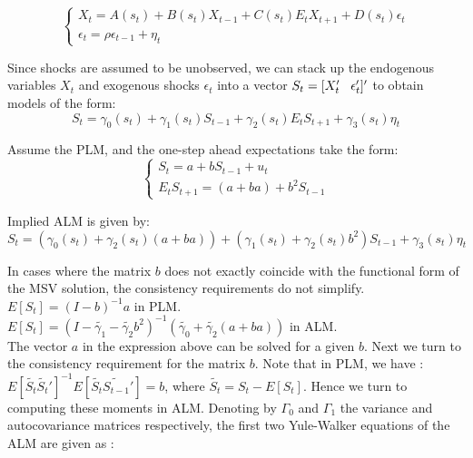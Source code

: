\documentclass[12pt,reqno]{article}
\numberwithin{equation}{section}
\begin{document}
$$
\begin{cases}
X_t = A(s_t) + B(s_t) X_{t-1} + C(s_t) E_t X_{t+1} + D(s_t) \epsilon_t \\
\epsilon_t = \rho \epsilon_{t-1} + \eta_t 
\end{cases}
$$

Since shocks are assumed to be unobserved, we can stack up the endogenous variables $X_t $ and exogenous shocks $\epsilon_t $ into a vector $ S_t = [X_t' \hspace{3 mm}\epsilon_t']' $ to obtain models of the form: \\

$$
S_t = \gamma_0 (s_t) + \gamma_1 (s_t) S_{t-1} + \gamma_2(s_t) E_t S_{t+1}  + \gamma_3 (s_t) \eta_t
$$

Assume the PLM, and the one-step ahead expectations take the form: \\

$$
\begin{cases}
S_t = a + b S_{t-1} + u_t \\
E_t S_{t+1} = (a+ba)+ b^2 S_{t-1} 
\end{cases}
$$

Implied ALM is given by: \\

$$ 
S_t = (\gamma_0 (s_t) + \gamma_2 (s_t) (a+ba))+ (\gamma_1 (s_t) +\gamma_2 (s_t) b^2 )S_{t-1} + \gamma_3(s_t) \eta_t 
$$

In cases where the matrix $b $ does not exactly coincide with the functional form of the MSV solution, the consistency requirements do not simplify. \\

$ E [ S_t ] = (I-b)^{-1} a  $ in PLM.  \\

$ E [S_t] = ( I -  \tilde{\gamma_1} - \tilde{\gamma_2} b^2 )^{-1} (\tilde{\gamma_0} + \tilde{\gamma_2}(a+ba)  ) $ in ALM. \\

The vector $ a $ in the expression above can be solved for a given $ b $. Next we turn to the consistency requirement for the matrix $ b $. Note that in PLM, we have : \\

$ E [ \tilde{S_t} \tilde{S_t}']^{-1} E [ \tilde{S_t} \tilde{S_{t-1}}'] = b $, where $\tilde{S_t} = S_t - E[S_t]$. Hence we turn to computing these moments in ALM. Denoting by $\Gamma_0 $ and $\Gamma_1 $ the variance and autocovariance matrices respectively, the first two Yule-Walker equations of the ALM are given as : \\
\end{document}
